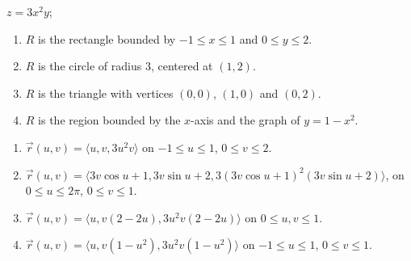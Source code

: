 {$z = 3x^2y$;
\begin{enumerate}
	\item $R$ is the rectangle bounded by $-1\leq x\leq 1$ and $0\leq y\leq 2$.
	\item	$R$ is the circle of radius 3, centered at $(1,2)$.
	\item	$R$ is the triangle with vertices $(0,0)$, $(1,0)$ and $(0,2)$.
	\item	$R$ is the region bounded by the $x$-axis and the graph of $y = 1-x^2$.
\end{enumerate}
}
{\begin{enumerate}
	\item $\vec r(u,v) = \langle u, v, 3u^2v\rangle$ on $-1\leq u\leq 1$, $0\leq v\leq 2$.
	\item	$\vec r(u,v) = \langle 3v\cos u+1, 3v\sin u+2, 3(3v\cos u+1)^2(3v\sin u+2)\rangle$, on $0\leq u\leq 2\pi$, $0\leq v\leq 1$.
	\item	$\vec r(u,v) = \langle u, v(2-2u), 3u^2v(2-2u)\rangle$ on $0\leq u, v\leq 1$.
	\item	$\vec r(u,v) = \langle u, v(1-u^2), 3u^2v(1-u^2)\rangle$ on $-1\leq u\leq 1$, $0\leq v\leq 1$.
\end{enumerate}
}
